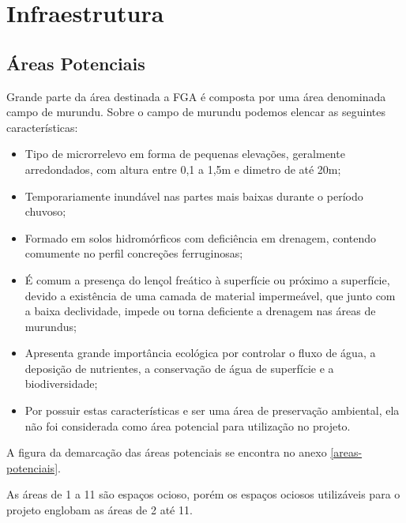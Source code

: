 \section{Infraestrutura}

\subsection{Áreas Potenciais}

  Grande parte da área destinada a FGA é composta por uma área denominada campo de murundu. Sobre o campo de murundu podemos elencar as
  seguintes características:

  \begin{itemize}
    \item Tipo de microrrelevo em forma de pequenas elevações, geralmente arredondados, com altura entre 0,1 a 1,5m e dimetro de até 20m;
    \item Temporariamente inundável nas partes mais baixas durante o período chuvoso;
    \item Formado em solos hidromórficos com deficiência em drenagem, contendo comumente no perfil concreções ferruginosas;
    \item É comum a presença do lençol freático à superfície ou próximo a superfície, devido a existência de uma camada de material
      impermeável, que junto com a baixa declividade, impede ou torna deficiente a drenagem nas áreas de murundus;
    \item Apresenta grande import\^{a}ncia ecológica por controlar o fluxo de água, a deposição de nutrientes, a conservação de água de
      superfície e a biodiversidade;
    \item Por possuir estas características e ser uma área de preservação ambiental, ela não foi considerada como área potencial
      para utilização no projeto.
  \end{itemize}

  A figura da demarcação das áreas potenciais se encontra no anexo \ref{areas-potenciais}.

  As áreas de 1 a 11 são espaços ocioso, porém os espaços ociosos utilizáveis para o projeto englobam as áreas de 2 até 11.

